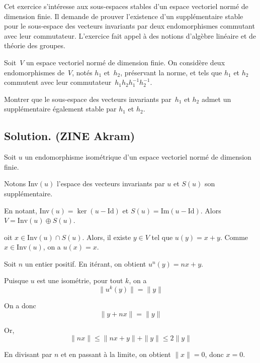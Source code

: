 Cet exercice s'int{\'e}resse aux sous-espaces stables d'un espace vectoriel
norm{\'e} de dimension finie. Il demande de prouver l'existence d'un
suppl{\'e}mentaire stable pour le sous-espace des vecteurs invariants par deux
endomorphismes commutant avec leur commutateur. L'exercice fait appel {\`a}
des notions d'alg{\`e}bre lin{\'e}aire et de th{\'e}orie des groupes.

\begin{exercise}
Soit~$V$ un espace vectoriel norm{\'e} de dimension finie. On consid{\`e}re
deux endomorphismes de~$V$, not{\'e}s $h_1$ et~$h_2$, pr{\'e}servant la norme,
et tels que $h_1$ et $h_2$ commutent avec leur commutateur~$h_1 h_2 h_1^{- 1}
h_2^{- 1}$.

Montrer que le sous-espace des vecteurs invariants par~$h_1$ et $h_2$ admet
un suppl{\'e}mentaire {\'e}galement stable par $h_1$ et $h_2$.

\end{exercise}

\subsection*{Solution. (ZINE Akram)}


Soit $u$ un endomorphisme isom{\'e}trique d'un espace vectoriel norm{\'e} de
dimension finie.

Notons Inv$(u)$ l'espace des vecteurs invariants par $u$ et $S (u)$ son
suppl{\'e}mentaire.

En notant, Inv$(u) = \ker (u - \text{Id})$ et $S (u) = \text{Im} (u -
\text{Id})$. Alors $V = \text{Inv} (u) \oplus S (u)$.


oit $x \in \text{Inv} (u) \cap S (u)$. Alors, il existe $y \in V$ tel que $u
(y) = x + y$. Comme $x \in \text{Inv} (u)$, on a $u (x) = x$.

Soit $n$ un entier positif. En it{\'e}rant, on obtient $u^n (y) = nx + y$.

Puisque $u$ est une isom{\'e}trie, pour tout $k$, on a
\[ \|u^k (y)\|=\|y\| \]


On a donc
\[ \|y + nx\|=\|y\| \]


Or,
\[ \|nx\| \leq \|nx + y\|+\|y\| \leq 2\|y\| \]


En divisant par $n$ et en passant {\`a} la limite, on obtient $\|x\|= 0$,
donc $x = 0$.

